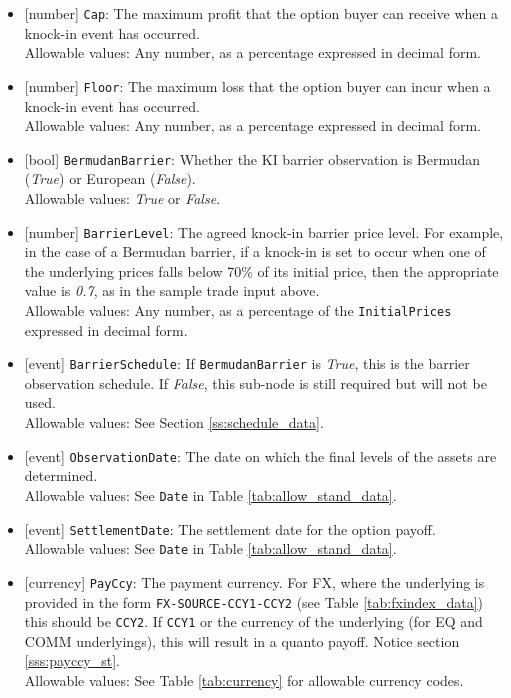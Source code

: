 \begin{itemize}
  \item{}[number] \lstinline!Cap!: The maximum profit that the option buyer can receive when a knock-in event has
  occurred. \\
  Allowable values: Any number, as a percentage expressed in decimal form.
  \item{}[number] \lstinline!Floor!: The maximum loss that the option buyer can incur when a knock-in event has
  occurred. \\
  Allowable values: Any number, as a percentage expressed in decimal form.
  \item{}[bool] \lstinline!BermudanBarrier!: Whether the KI barrier observation is Bermudan (\emph{True}) or European
  (\emph{False}). \\
  Allowable values: \emph{True} or \emph{False}.
  \item{}[number] \lstinline!BarrierLevel!: The agreed knock-in barrier price level. For example, in the case of a Bermudan barrier, if a knock-in is set to occur when one of the underlying prices falls below 70\% of its initial price, then the appropriate value is \emph{0.7}, as in the sample trade input above. \\
  Allowable values: Any number, as a percentage of the \lstinline!InitialPrices! expressed in decimal form.
  \item{}[event] \lstinline!BarrierSchedule!: If \lstinline!BermudanBarrier! is \emph{True}, this is the barrier observation
  schedule. If \emph{False}, this sub-node is still required but will not be used. \\
  Allowable values: See Section \ref{ss:schedule_data}.
  \item{}[event] \lstinline!ObservationDate!: The date on which the final levels of the assets are determined. \\
  Allowable values: See \lstinline!Date! in Table \ref{tab:allow_stand_data}.
  \item{}[event] \lstinline!SettlementDate!: The settlement date for the option payoff. \\
  Allowable values: See \lstinline!Date! in Table \ref{tab:allow_stand_data}.
  \item{}[currency] \lstinline!PayCcy!: The payment currency. For FX, where the underlying is provided
      in the form \lstinline!FX-SOURCE-CCY1-CCY2! (see Table \ref{tab:fxindex_data}) this should
      be \lstinline!CCY2!. If \lstinline!CCY1! or the currency of the underlying (for EQ and
      COMM underlyings), this will result in a quanto payoff. Notice section \ref{sss:payccy_st}. \\
        Allowable values: See Table \ref{tab:currency} for allowable currency codes.
\end{itemize}

